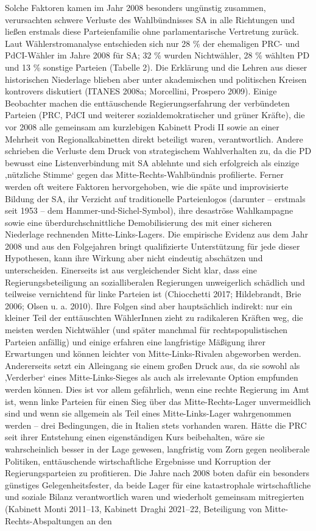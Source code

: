 \begin{multicols*}{2}
Solche Faktoren kamen im Jahr 2008 besonders ungünstig zusammen, verursachten schwere Verluste des Wahlbündnisses SA in alle Richtungen und ließen erstmals diese Parteienfamilie ohne parlamentarische Vertretung zurück. Laut Wählerstromanalyse entschieden sich nur 28 \% der ehemaligen PRC- und PdCI-Wähler im Jahre 2008 für SA; 32 \% wurden Nichtwähler, 28 \% wählten PD und 13 \% sonstige Parteien (Tabelle 2). Die Erklärung und die Lehren aus dieser historischen Niederlage blieben aber unter akademischen und politischen Kreisen kontrovers diskutiert (ITANES 2008a; Morcellini, Prospero 2009). Einige Beobachter machen die enttäuschende Regierungserfahrung der verbündeten Parteien (PRC, PdCI und weiterer sozialdemokratischer und grüner Kräfte), die vor 2008 alle gemeinsam am kurzlebigen Kabinett Prodi II sowie an einer Mehrheit von Regionalkabinetten direkt beteiligt waren, verantwortlich. Andere schrieben die Verluste dem Druck von strategischem Wahlverhalten zu, da die PD bewusst eine Listenverbindung mit SA ablehnte und sich erfolgreich als einzige ‚nützliche Stimme‘ gegen das Mitte-Rechts-Wahlbündnis profilierte. Ferner werden oft weitere Faktoren hervorgehoben, wie die späte und improvisierte Bildung der SA, ihr Verzicht auf traditionelle Parteienlogos (darunter – erstmals seit 1953 – dem Hammer-und-Sichel-Symbol), ihre desaströse Wahlkampagne sowie eine überdurchschnittliche Demobilisierung des mit einer sicheren Niederlage rechnenden Mitte-Links-Lagers. Die empirische Evidenz aus dem Jahr 2008 und aus den Folgejahren bringt qualifizierte Unterstützung für jede dieser Hypothesen, kann ihre Wirkung aber nicht eindeutig abschätzen und unterscheiden. Einerseits ist aus vergleichender Sicht klar, dass eine Regierungsbeteiligung an sozialliberalen Regierungen unweigerlich schädlich und teilweise vernichtend für linke Parteien ist (Chiocchetti 2017; Hildebrandt, Brie 2006; Olsen u. a. 2010). Ihre Folgen sind aber hauptsächlich indirekt: nur ein kleiner Teil der enttäuschten WählerInnen zieht zu radikaleren Kräften weg, die meisten werden Nichtwähler (und später manchmal für rechtspopulistischen Parteien anfällig) und einige erfahren eine langfristige Mäßigung ihrer Erwartungen und können leichter von Mitte-Links-Rivalen abgeworben werden. Andererseits setzt ein Alleingang sie einem großen Druck aus, da sie sowohl als ‚Verderber‘ eines Mitte-Links-Sieges als auch als irrelevante Option empfunden werden können. Dies ist vor allem gefährlich, wenn eine rechte Regierung im Amt ist, wenn linke Parteien für einen Sieg über das Mitte-Rechts-Lager unvermeidlich sind und wenn sie allgemein als Teil eines Mitte-Links-Lager wahrgenommen werden – drei Bedingungen, die in Italien stets vorhanden waren. Hätte die PRC seit ihrer Entstehung einen eigenständigen Kurs beibehalten, wäre sie wahrscheinlich besser in der Lage gewesen, langfristig vom Zorn gegen neoliberale Politiken, enttäuschende wirtschaftliche Ergebnisse und Korruption der Regierungsparteien zu profitieren. Die Jahre nach 2008 boten dafür ein besonders günstiges Gelegenheitsfester, da beide Lager für eine katastrophale wirtschaftliche und soziale Bilanz verantwortlich waren und wiederholt gemeinsam mitregierten (Kabinett Monti 2011–13, Kabinett Draghi 2021–22, Beteiligung von Mitte-Rechts-Abspaltungen an den 
\end{multicols*}
